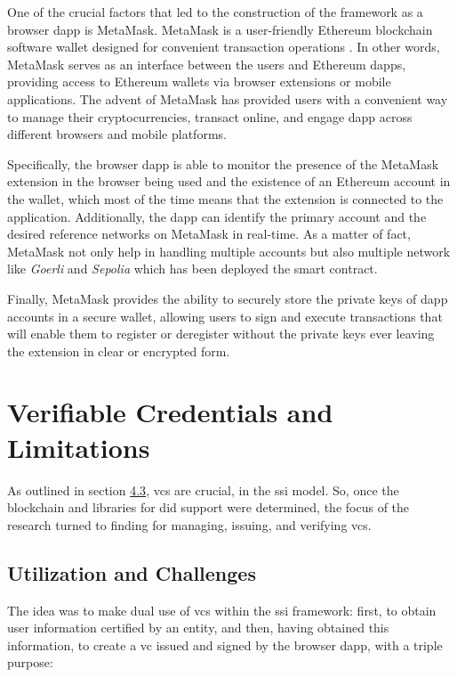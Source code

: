 One of the crucial factors that led to the construction of the framework as a browser \gls{dapp} is MetaMask. MetaMask is a user-friendly Ethereum blockchain software 
wallet designed for convenient transaction operations \cite{metamask}. In other words, MetaMask serves as an interface between the users and Ethereum \gls{dapp}s, providing access to Ethereum 
wallets via browser extensions or mobile applications. The advent of MetaMask has provided users with a convenient way to manage their cryptocurrencies, transact online, 
and engage \gls{dapp} across different browsers and mobile platforms. 

Specifically, the browser \gls{dapp} is able to monitor the presence of the MetaMask extension in the browser being used and the existence of an Ethereum 
account in the wallet, which most of the time means that the extension is connected to the application. Additionally, the \gls{dapp} can identify the primary account and the 
desired reference networks on MetaMask in real-time. As a matter of fact, MetaMask not only help in handling multiple accounts but also multiple network like \textit{Goerli} and 
\textit{Sepolia} which has been deployed the smart contract.

Finally, MetaMask provides the ability to securely store the private keys of \gls{dapp} accounts in a secure wallet, allowing users to sign and execute transactions that will 
enable them to register or deregister without the private keys ever leaving the extension in clear or encrypted form.

\section{Verifiable Credentials and Limitations} \label{sec:6.3}

As outlined in section \hyperref[sec:4.3]{4.3}, \gls{vc}s are crucial, in the \gls{ssi} model. So, once the blockchain and libraries for \gls{did} support were determined, the focus of the 
research turned to finding for managing, issuing, and verifying \gls{vc}s.

\subsection{Utilization and Challenges}

The idea was to make dual use of \gls{vc}s within the \gls{ssi} framework: first, to obtain user information certified by an entity, and then, having obtained this information, to 
create a \gls{vc} issued and signed by the browser \gls{dapp}, with a triple purpose:

